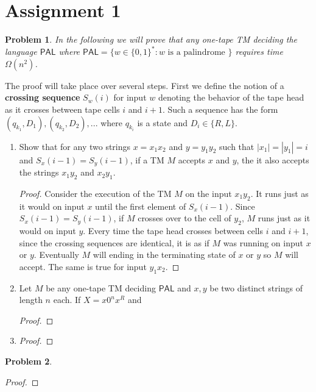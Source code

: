 \documentclass[11pt]{article}
\def\PAL{\mathsf{PAL}}
\newtheorem{problem}{Problem}
\begin{document}
\rhead{\today}

\section*{Assignment 1}

\begin{problem}
In the following we will prove that any one-tape TM deciding the language $\PAL$ where $\PAL = \{w \in \{0,1\}^*: w \mbox{ is a palindrome }\}$ requires time $\Omega(n^2)$.
\end{problem}
The proof will take place over several steps. First we define the notion of a \textbf{crossing sequence} $S_w(i)$ for input $w$ denoting the behavior of the tape head as it crosses between tape cells $i$ and $i+1$. Such a sequence has the form $(q_{k_1}, D_1), (q_{k_2}, D_2), ...$ where $q_{k_i}$ is a state and $D_i \in \{R, L\}$.
\begin{enumerate}
\item Show that for any two strings $x = x_1x_2$ and $y=y_1y_2$ such that $|x_1|=|y_1| = i$ and $S_x(i-1) = S_y(i-1)$, if a TM $M$ accepts $x$ and $y$, the it also accepts the strings $x_1y_2$ and $x_2y_1$.  
\begin{proof}
Consider the execution of the TM $M$ on the input $x_1y_2$. It runs just as it would on input $x$ until the first element of $S_x(i-1)$. Since $S_x(i-1) = S_y(i-1)$, if $M$ crosses over to the cell of $y_2$, $M$ runs just as it would on input $y$. Every time the tape head crosses between cells $i$ and $i+1$, since the crossing sequences are identical, it is as if $M$ was running on input $x$ or $y$. Eventually $M$ will ending in the terminating state of $x$ or $y$ so $M$ will accept. The same is true for input $y_1x_2$. 
\end{proof}
\item Let $M$ be any one-tape TM deciding $\PAL$ and $x, y$ be two distinct strings of length $n$ each. If $X = x0^nx^R$ and
\begin{proof}

\end{proof}
\item
\begin{proof}

\end{proof}
\end{enumerate}



\begin{problem}

\end{problem}
\begin{proof}

\end{proof}
\end{document}

